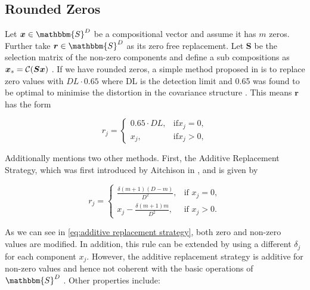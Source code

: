 \subsection{Rounded Zeros}
\label{sec:Rounded Zeros}

Let $\bm{x} \in \mathbbm{S}^D$ be a compositional vector and assume it has $m$ zeros. Further take $\bm{r} \in \mathbbm{S}^D$ as its zero free replacement. Let $\bm{S}$ be the selection matrix of the non-zero components and define a sub compositions as $\bm{x}_s=\mathcal{C}(\bm{Sx})$ . If we have rounded zeros, a simple method proposed in \cite{Josep:2003} is to replace zero values with $DL \cdot 0.65$ where DL is the detection limit and 0.65 was found to be optimal to minimise the distortion in the covariance structure \cite{Lubbe:2021}. This means $\bm{r}$ has the form

\begin{equation}
r_j = 
\begin{cases}
0.65\cdot DL, & \text{if} x_j=0, \\
x_j, & \text{if} x_j>0, 
\end{cases}
\label{eq:DL065}
\end{equation}

Additionally \cite{Josep:2003} mentions two other methods. First, the Additive Replacement Strategy, which was first introduced by Aitchison in \cite{Aitchison:1986}, and is given by

\begin{equation}
r_j = 
\begin{cases}
\frac{\delta(m+1)(D-m)}{D^2}, & \text{if } x_j=0, \\
x_j - \frac{\delta(m+1)m}{D^2}, & \text{if } x_j>0.
\end{cases}
\label{eq:additive replacement strategy}
\end{equation}

As we can see in \ref{eq:additive replacement strategy}, both zero and non-zero values are modified. In addition, this rule can be extended by using a different $\delta_j$ for each component $x_j$. However, the additive replacement strategy is additive for non-zero values and hence not coherent with the basic operations of $\mathbbm{S}^D$ \cite{Josep:2003}. Other properties include:

